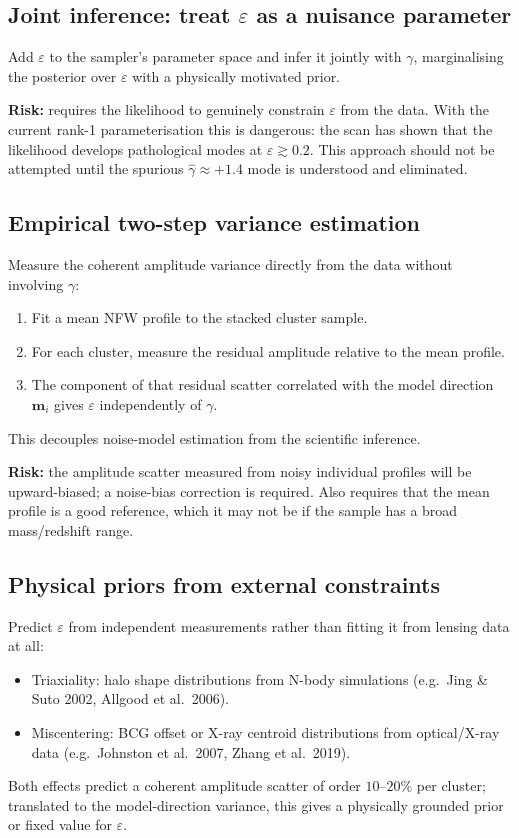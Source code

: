 \documentclass[11pt,a4paper]{article}
\begin{document}
\subsection{Joint inference: treat $\varepsilon$ as a nuisance parameter}
Add $\varepsilon$ to the sampler's parameter space and infer it jointly with
$\gamma$, marginalising the posterior over $\varepsilon$ with a physically
motivated prior.

\textbf{Risk:} requires the likelihood to genuinely constrain $\varepsilon$
from the data.  With the current rank-1 parameterisation this is dangerous:
the scan has shown that the likelihood develops pathological modes at
$\varepsilon \gtrsim 0.2$.  This approach should not be attempted until the
spurious $\hat\gamma \approx +1.4$ mode is understood and eliminated.

\subsection{Empirical two-step variance estimation}
Measure the coherent amplitude variance directly from the data without
involving $\gamma$:
\begin{enumerate}
  \item Fit a mean NFW profile to the stacked cluster sample.
  \item For each cluster, measure the residual amplitude relative to
        the mean profile.
  \item The component of that residual scatter correlated with the model
        direction $\mathbf{m}_i$ gives $\varepsilon$ independently of $\gamma$.
\end{enumerate}
This decouples noise-model estimation from the scientific inference.

\textbf{Risk:} the amplitude scatter measured from noisy individual profiles
will be upward-biased; a noise-bias correction is required.  Also requires
that the mean profile is a good reference, which it may not be if the sample
has a broad mass/redshift range.

\subsection{Physical priors from external constraints}
Predict $\varepsilon$ from independent measurements rather than fitting it
from lensing data at all:
\begin{itemize}
  \item Triaxiality: halo shape distributions from N-body simulations
        (e.g.\ Jing \& Suto 2002, Allgood et al.\ 2006).
  \item Miscentering: BCG offset or X-ray centroid distributions from
        optical/X-ray data (e.g.\ Johnston et al.\ 2007, Zhang et al.\ 2019).
\end{itemize}
Both effects predict a coherent amplitude scatter of order $10$--$20\%$ per
cluster; translated to the model-direction variance, this gives a physically
grounded prior or fixed value for $\varepsilon$.
\end{document}
